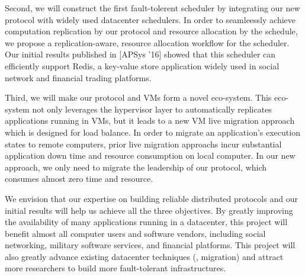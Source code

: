 Second, we will construct the first fault-tolerent scheduler by integrating our 
new protocol with widely used datacenter schedulers. In order to seamleessly 
achieve computation replication by our protocol and resource allocation by the 
schedule, we propose a replication-aware, resource allocation workflow for the 
scheduler. Our initial results published in [APSys '16] showed that this 
scheduler can efficiently support Redis, a key-value store application widely 
used in social network and financial trading platforms.


Third, we will make our protocol and VMs form a novel eco-system. This 
eco-system not only leverages the hypervisor layer to automatically replicates 
applications running in VMs, but it leads to a new VM live migration approach 
which is designed for load balance. In order to migrate an application's 
execution states to remote computers, prior live migration approachs incur 
substantial application down time and resource consumption on local computer. 
In 
our new approach, we only need to migrate the leadership of our protocol, which 
consumes almost zero time and resource.


We envision that our expertise on building reliable distributed protocols and 
our initial results will help us achieve all the three objectives. By greatly 
improving the availability of many applications running in a datacenter, this 
project will benefit almost all computer users and software vendors, including 
social networking, military software services, and financial platforms. This 
project will also greatly advance existing datacenter techniques (\eg, 
migration) and attract more researchers to build more fault-tolerant 
infrastructures.
